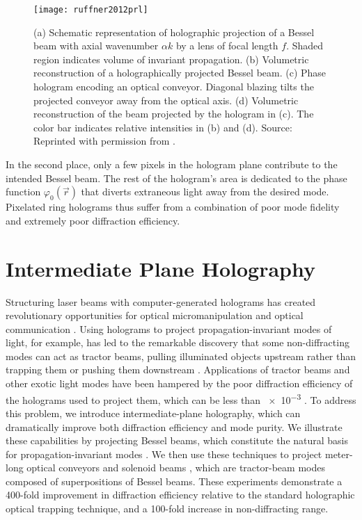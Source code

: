 \begin{figure}[t!]
  \centering
  \texttt{[image: ruffner2012prl]}
  \caption{(a) Schematic representation of holographic projection of a Bessel beam with axial wavenumber $\alpha k$ by a lens of focal length $f$. Shaded region indicates volume of invariant propagation. (b) Volumetric reconstruction of a holographically projected Bessel beam. (c) Phase hologram encoding an optical conveyor. Diagonal blazing tilts the projected conveyor away from the optical axis. (d) Volumetric reconstruction of the beam projected by the hologram in (c). The color bar indicates relative intensities in (b) and (d). Source: Reprinted with permission from \cite{ruffner12a}.}
  \label{fig:previous bessel hologram}
\end{figure}


In the second place, only a few pixels in
the hologram plane contribute to the intended Bessel beam.
The rest of the hologram's area is dedicated to the
phase function $\varphi_0(\vec{r})$ that diverts
extraneous light away from the desired mode.
Pixelated ring holograms thus suffer from a combination of
poor mode fidelity and extremely poor diffraction efficiency.






\section{Intermediate Plane Holography}

Structuring laser beams with computer-generated holograms
has created revolutionary opportunities for
optical micromanipulation \cite{grier03} and
optical communication \cite{gibson04,bozinovic13,willner15}.
Using holograms to project propagation-invariant modes of light,
for example, has led to the remarkable
discovery that some non-diffracting modes
can act as tractor beams, pulling illuminated objects
upstream rather than trapping them or pushing them downstream
\cite{marston06,lee10}.
Applications of tractor beams and other exotic light modes have
been hampered by the poor diffraction efficiency of the
holograms used to project them, which can be less
than \num{e-3} \cite{ruffner12a,ruffner14}.
To address this problem, we introduce intermediate-plane
holography, which can dramatically improve
both diffraction efficiency and mode purity.
We illustrate these capabilities by projecting
Bessel beams, which constitute 
the natural basis for propagation-invariant modes \cite{durnin87,durnin87a}.
We then use these techniques to project meter-long
optical conveyors \cite{cizmar05,ruffner12a,ruffner14}
and solenoid beams \cite{lee10,yevick16}, 
which are tractor-beam modes composed of superpositions of Bessel
beams.
These experiments demonstrate a \num{400}-fold improvement in 
diffraction efficiency relative to the standard holographic optical
trapping technique, and a
\num{100}-fold increase in non-diffracting range.

